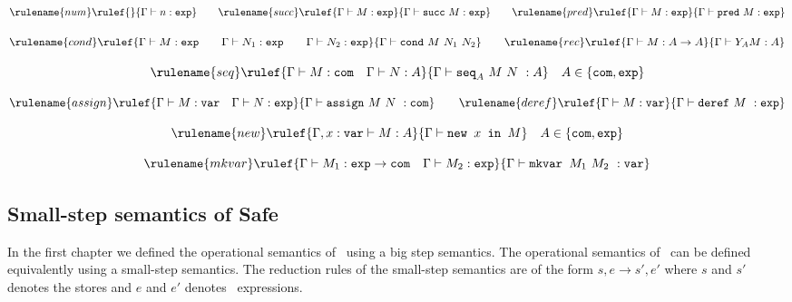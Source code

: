 $$ \rulename{num} \rulef{}{\Gamma \vdash n :\texttt{exp}}
\qquad \rulename{succ} \rulef{\Gamma \vdash M:\texttt{exp} }{\Gamma \vdash \texttt{succ}\ M:\texttt{exp}}
\qquad \rulename{pred} \rulef{\Gamma \vdash M:\texttt{exp} }{\Gamma \vdash \texttt{pred}\ M:\texttt{exp}}$$

$$
\rulename{cond} \rulef{\Gamma \vdash M : \texttt{exp} \qquad \Gamma \vdash N_1 : \texttt{exp} \qquad \Gamma \vdash N_2 : \texttt{exp} }{\Gamma \vdash \texttt{cond}\ M\ N_1\ N_2}
\qquad  \rulename{rec} \rulef{\Gamma \vdash M : A\rightarrow A }{ \Gamma \vdash Y_A M : A}$$

$$ \rulename{seq} \rulef{\Gamma \vdash M : \texttt{com} \quad \Gamma \vdash N :A}
    {\Gamma \vdash \texttt{seq}_A \ M\ N\ : A} \quad A \in \{ \texttt{com}, \texttt{exp}\}$$

$$ \rulename{assign} \rulef{\Gamma \vdash M : \texttt{var} \quad \Gamma \vdash N : \texttt{exp}}
    {\Gamma \vdash \texttt{assign}\ M\ N\ : \texttt{com}}
\qquad
 \rulename{deref} \rulef{\Gamma \vdash M : \texttt{var}}
    {\Gamma \vdash \texttt{deref}\ M\ : \texttt{exp}}$$

$$ \rulename{new} \rulef{\Gamma, x : \texttt{var} \vdash M : A}
    {\Gamma \vdash \texttt{new } x \texttt{ in } M} \quad A \in \{ \texttt{com}, \texttt{exp}\}$$

$$ \rulename{mkvar} \rulef{\Gamma \vdash M_1 : \texttt{exp} \rightarrow \texttt{com} \quad \Gamma \vdash M_2 : \texttt{exp}}
    {\Gamma \vdash \texttt{mkvar } M_1\ M_2\ : \texttt{var}}$$

\subsection{Small-step semantics of Safe \ialgol}
In the first chapter we defined the operational semantics of \ialgol\ using a big step semantics.
The operational semantics of \ialgol\ can be defined equivalently using a small-step semantics.
The reduction rules of the small-step semantics are of the form $s,e \rightarrow s',e'$ where $s$ and $s'$ denotes the
stores and $e$ and $e'$ denotes \ialgol\ expressions.

